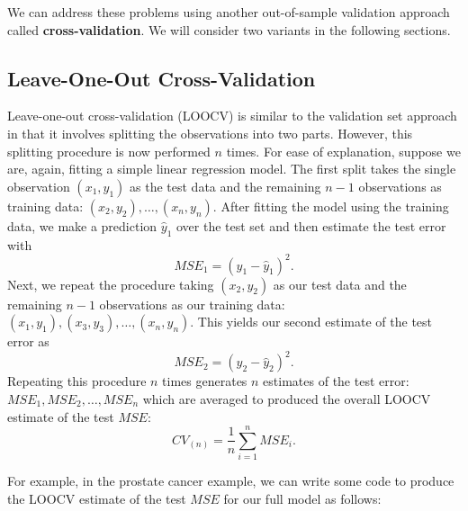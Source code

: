 \documentclass[
]{article}
\begin{document}
We can address these problems using another out-of-sample validation
approach called \textbf{cross-validation}. We will consider two variants
in the following sections.

\hypertarget{leave-one-out-cross-validation}{%
\subsection{Leave-One-Out
Cross-Validation}\label{leave-one-out-cross-validation}}

Leave-one-out cross-validation (LOOCV) is similar to the validation set
approach in that it involves splitting the observations into two parts.
However, this splitting procedure is now performed \(n\) times. For ease
of explanation, suppose we are, again, fitting a simple linear
regression model. The first split takes the single observation
\((x_1, y_1)\) as the test data and the remaining \(n-1\) observations
as training data: \((x_2, y_2), \ldots, (x_n, y_n)\). After fitting the
model using the training data, we make a prediction \(\hat{y}_1\) over
the test set and then estimate the test error with \begin{equation*}
MSE_1 = (y_1 - \hat{y}_1)^2.
\end{equation*} Next, we repeat the procedure taking \((x_2, y_2)\) as
our test data and the remaining \(n-1\) observations as our training
data: \((x_1, y_1), (x_3, y_3), \ldots, (x_n, y_n)\). This yields our
second estimate of the test error as \begin{equation*}
MSE_2 = (y_2 - \hat{y}_2)^2.
\end{equation*} Repeating this procedure \(n\) times generates \(n\)
estimates of the test error: \(MSE_1, MSE_2, \ldots, MSE_n\) which are
averaged to produced the overall LOOCV estimate of the test \(MSE\):
\begin{equation*}
CV_{(n)} = \frac{1}{n} \sum_{i=1}^n MSE_i.
\end{equation*}

For example, in the prostate cancer example, we can write some code to
produce the LOOCV estimate of the test \(MSE\) for our full model as
follows:
\end{document}
